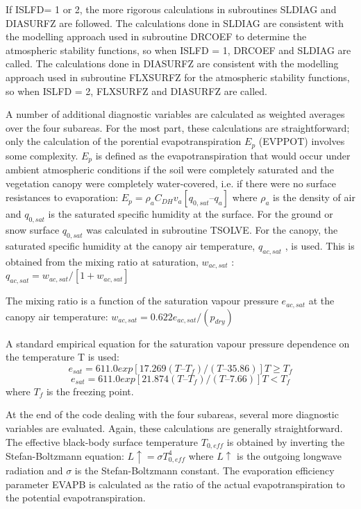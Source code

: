 If I\+S\+L\+F\+D= 1 or 2, the more rigorous calculations in subroutines S\+L\+D\+I\+A\+G and D\+I\+A\+S\+U\+R\+F\+Z are followed. The calculations done in S\+L\+D\+I\+A\+G are consistent with the modelling approach used in subroutine D\+R\+C\+O\+E\+F to determine the atmospheric stability functions, so when I\+S\+L\+F\+D = 1, D\+R\+C\+O\+E\+F and S\+L\+D\+I\+A\+G are called. The calculations done in D\+I\+A\+S\+U\+R\+F\+Z are consistent with the modelling approach used in subroutine F\+L\+X\+S\+U\+R\+F\+Z for the atmospheric stability functions, so when I\+S\+L\+F\+D = 2, F\+L\+X\+S\+U\+R\+F\+Z and D\+I\+A\+S\+U\+R\+F\+Z are called.

A number of additional diagnostic variables are calculated as weighted averages over the four subareas. For the most part, these calculations are straightforward; only the calculation of the porential evapotranspiration $E_p$ (E\+V\+P\+P\+O\+T) involves some complexity. $E_p$ is defined as the evapotranspiration that would occur under ambient atmospheric conditions if the soil were completely saturated and the vegetation canopy were completely water-\/covered, i.\+e. if there were no surface resistances to evaporation\+: $E_p = \rho_a C_{DH} v_a [q_{0,sat} – q_a ]$ where $\rho_a$ is the density of air and $q_{0,sat}$ is the saturated specific humidity at the surface. For the ground or snow surface $q_{0,sat}$ was calculated in subroutine T\+S\+O\+L\+V\+E. For the canopy, the saturated specific humidity at the canopy air temperature, $q_{ac,sat}$ , is used. This is obtained from the mixing ratio at saturation, $w_{ac,sat}$ \+: $q_{ac,sat} = w_{ac,sat} /[1 + w_{ac,sat} ]$

The mixing ratio is a function of the saturation vapour pressure $e_{ac,sat}$ at the canopy air temperature\+: $w_{ac,sat} = 0.622 e_{ac,sat} /(p_{dry} )$

A standard empirical equation for the saturation vapour pressure dependence on the temperature T is used\+: \[e_{sat} = 611.0 exp[17.269(T – T_f )/(T – 35.86)] T \geq T_f \] \[e_{sat} = 611.0 exp[21.874(T – T_f )/(T – 7.66)] T < T_f \] where $T_f$ is the freezing point.

At the end of the code dealing with the four subareas, several more diagnostic variables are evaluated. Again, these calculations are generally straightforward. The effective black-\/body surface temperature $T_{0,eff}$ is obtained by inverting the Stefan-\/\+Boltzmann equation\+: $L\uparrow = \sigma T_{0,eff}^4$ where $L\uparrow$ is the outgoing longwave radiation and $\sigma$ is the Stefan-\/\+Boltzmann constant. The evaporation efficiency parameter E\+V\+A\+P\+B is calculated as the ratio of the actual evapotranspiration to the potential evapotranspiration.